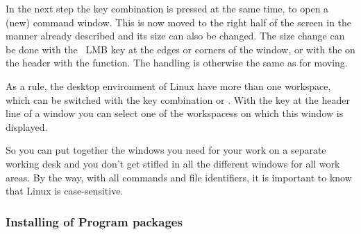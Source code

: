 In the next step the key combination  is pressed at the same time,
to open a (new) command window.
This is now moved to the right half of the screen in the manner already described and
its size can also be changed.
The size change can be done with the \ LMB key at the edges or corners of the window,
or with the \RMB on the header with the   function.
The handling is otherwise the same as for moving.

As a rule, the desktop environment of Linux have more than one workspace,
which can be switched with the key combination  or
.
With the \RMB key at the header line of a window you can select one of the workspacess
on which this window is displayed.

So you can put together the windows you need for your work on a separate working desk and
you don't get stifled in all the different windows for all work areas.
By the way, with all commands and file identifiers, it is important to know
that Linux is case-sensitive. 

\subsubsection{Installing of Program packages}

